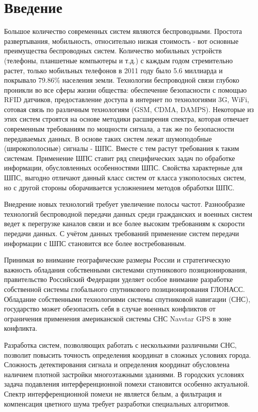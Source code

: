 \chapter*{Введение}

Большое количество современных систем являются беспроводными. Простота развертывания, мобильность, относительно низкая
стоимость - вот основные преимущества беспроводных систем. Количество мобильных устройств (телефоны, планшетные компьютеры
и т.д.) с каждым годом стремительно растет, только мобильных телефонов в 2011 году было 5.6 миллиарда и покрывало 79.86\%
\cite{wiki_mobilenum} населения земли. Технологии беспроводной связи глубоко проникли во все сферы жизни общества:
обеспечение безопасности с помощью RFID датчиков, предоставление доступа в интернет по технологиями 3G, WiFi, 
сотовая связь по различным технологиям (GSM, CDMA, DAMPS). Некоторые из этих систем строятся на основе методики
расширения спектра, которая отвечает современным требованиям по мощности сигнала, а так же по безопасности передаваемых
данных. В основе таких систем лежат шумоподобные (широкополосные) сигналы - ШПС. Вместе с тем растут требования к таким
системам. Применение ШПС ставит ряд специфических задач по обработке информации, обусловленных особенностями ШПС.
Свойства характерные для ШПС, выгодно отличают данный класс систем от класса узкополосных систем, но с другой стороны
оборачивается усложнением методов обработки ШПС.

Внедрение новых технологий требует увеличение полосы частот. Разнообразие технологий беспроводной передачи данных среди
гражданских и военных систем ведет к перегрузке каналов связи и все более высоким требованиям к скорости передачи
данных. С учётом данных требований применение систем передачи информации с ШПС становится все более востребованным.

Принимая во внимание географические размеры России и стратегическую важность обладания собственными системами спутникового
позиционирования, правительство Российский Федерации уделяет особое внимание разработке собственной системы
глобального спутникового позиционирования ГЛОНАСС. Обладание собственными технологиями системы спутниковой навигации (СНС), государство может обезопасить
себя в случае военных конфликтов от ограничения применения американской системы СНС Navstar GPS в зоне конфликта.

Разработка систем, позволяющих работать с несколькими различными СНС, позволит повысить точность определения координат
в сложных условиях города. Сложность детектирования сигнала и определения координат обусловлена наличием плотной
застройки многоэтажными зданиями. В городских условиях задача подавления интерференционной помехи становится особенно
актуальной. Спектр интерференционной помехи не является белым, а фильтрация и компенсация цветного шума
требует разработки специальных алгоритмов.

